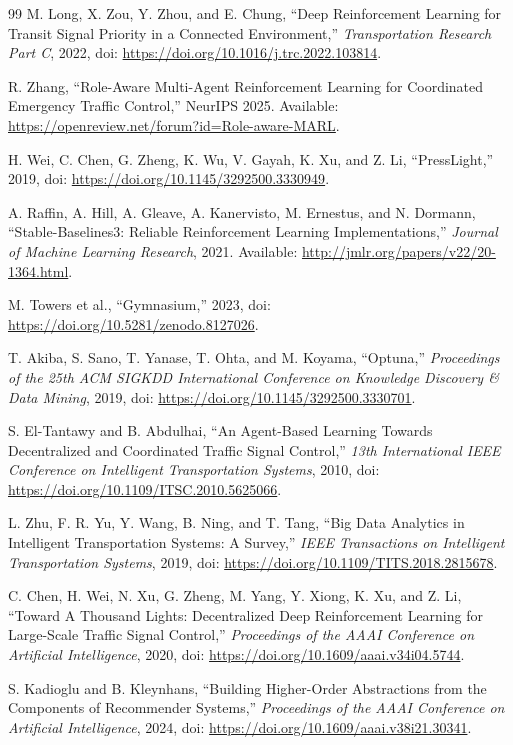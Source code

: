 \begin{thebibliography}{99}
M. Long, X. Zou, Y. Zhou, and E. Chung, ``Deep Reinforcement Learning for Transit Signal Priority in a Connected Environment,'' \textit{Transportation Research Part C}, 2022, doi: \url{https://doi.org/10.1016/j.trc.2022.103814}.

R. Zhang, ``Role-Aware Multi-Agent Reinforcement Learning for Coordinated Emergency Traffic Control,'' NeurIPS 2025. Available: \url{https://openreview.net/forum?id=Role-aware-MARL}.

H. Wei, C. Chen, G. Zheng, K. Wu, V. Gayah, K. Xu, and Z. Li, ``PressLight,'' 2019, doi: \url{https://doi.org/10.1145/3292500.3330949}.

A. Raffin, A. Hill, A. Gleave, A. Kanervisto, M. Ernestus, and N. Dormann, ``Stable-Baselines3: Reliable Reinforcement Learning Implementations,'' \textit{Journal of Machine Learning Research}, 2021. Available: \url{http://jmlr.org/papers/v22/20-1364.html}.

M. Towers et al., ``Gymnasium,'' 2023, doi: \url{https://doi.org/10.5281/zenodo.8127026}.

T. Akiba, S. Sano, T. Yanase, T. Ohta, and M. Koyama, ``Optuna,'' \textit{Proceedings of the 25th ACM SIGKDD International Conference on Knowledge Discovery \& Data Mining}, 2019, doi: \url{https://doi.org/10.1145/3292500.3330701}.

S. El-Tantawy and B. Abdulhai, ``An Agent-Based Learning Towards Decentralized and Coordinated Traffic Signal Control,'' \textit{13th International IEEE Conference on Intelligent Transportation Systems}, 2010, doi: \url{https://doi.org/10.1109/ITSC.2010.5625066}.

L. Zhu, F. R. Yu, Y. Wang, B. Ning, and T. Tang, ``Big Data Analytics in Intelligent Transportation Systems: A Survey,'' \textit{IEEE Transactions on Intelligent Transportation Systems}, 2019, doi: \url{https://doi.org/10.1109/TITS.2018.2815678}.

C. Chen, H. Wei, N. Xu, G. Zheng, M. Yang, Y. Xiong, K. Xu, and Z. Li, ``Toward A Thousand Lights: Decentralized Deep Reinforcement Learning for Large-Scale Traffic Signal Control,'' \textit{Proceedings of the AAAI Conference on Artificial Intelligence}, 2020, doi: \url{https://doi.org/10.1609/aaai.v34i04.5744}.

S. Kadioglu and B. Kleynhans, ``Building Higher-Order Abstractions from the Components of Recommender Systems,'' \textit{Proceedings of the AAAI Conference on Artificial Intelligence}, 2024, doi: \url{https://doi.org/10.1609/aaai.v38i21.30341}.


\end{thebibliography}
